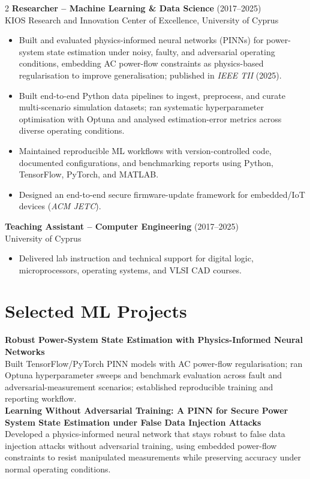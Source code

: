 \documentclass[10pt,a4paper]{article}
\begin{document}
\begin{multicols}{2}
\textbf{Researcher -- Machine Learning \& Data Science} (2017--2025)\\
KIOS Research and Innovation Center of Excellence, University of Cyprus
\begin{itemize}
  \item Built and evaluated physics-informed neural networks (PINNs) for power-system state estimation under noisy, faulty, and adversarial operating conditions, embedding AC power-flow constraints as physics-based regularisation to improve generalisation; published in \textit{IEEE TII} (2025).
  \item Built end-to-end Python data pipelines to ingest, preprocess, and curate multi-scenario simulation datasets; ran systematic hyperparameter optimisation with Optuna and analysed estimation-error metrics across diverse operating conditions.
  \item Maintained reproducible ML workflows with version-controlled code, documented configurations, and benchmarking reports using Python, TensorFlow, PyTorch, and MATLAB.
  \item Designed an end-to-end secure firmware-update framework for embedded/IoT devices (\textit{ACM JETC}).
\end{itemize}

\textbf{Teaching Assistant -- Computer Engineering} (2017--2025)\\
University of Cyprus
\begin{itemize}
  \item Delivered lab instruction and technical support for digital logic, microprocessors, operating systems, and VLSI CAD courses.
\end{itemize}

\section*{Selected ML Projects}
\textbf{Robust Power-System State Estimation with Physics-Informed Neural Networks}\\
Built TensorFlow/PyTorch PINN models with AC power-flow regularisation; ran Optuna hyperparameter sweeps and benchmark evaluation across fault and adversarial-measurement scenarios; established reproducible training and reporting workflow.\\[5pt]
\textbf{Learning Without Adversarial Training: A PINN for Secure Power System State Estimation under False Data Injection Attacks}\\
Developed a physics-informed neural network that stays robust to false data injection attacks without adversarial training, using embedded power-flow constraints to resist manipulated measurements while preserving accuracy under normal operating conditions.


\end{multicols}
\end{document}
